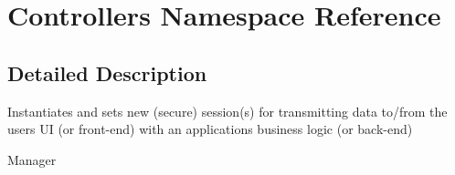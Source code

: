 \hypertarget{namespace_controllers}{}\section{Controllers Namespace Reference}
\label{namespace_controllers}


\subsection{Detailed Description}
Instantiates and sets new (secure) session(s) for transmitting data to/from the user\textquotesingle{}s UI (or front-\/end) with an application\textquotesingle{}s business logic (or back-\/end)

Manager 